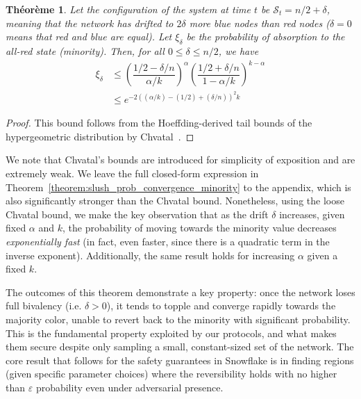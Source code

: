 \documentclass[letterpaper,twocolumn,10pt]{article}
\newtheorem{theorem}{Théorème}
\theoremstyle{definition}
\begin{document}
\begin{theorem}
Let the configuration of the system at time $t$ be $\mathcal{S}_t = n/2 + \delta$, meaning that the network has drifted to $2\delta$ more blue nodes than red nodes ($\delta = 0$ means that red and blue are equal). Let $\xi_\delta$ be the probability of absorption to the all-red state (minority). Then, for all $0 \leq \delta \leq n/2$, we have 
\begin{equation}
\begin{split}
    \xi_\delta &\leq \left(\dfrac{1/2 - \delta/n}{\alpha/k}\right)^{\alpha}\left(\dfrac{1/2 + \delta/n}{1- \alpha/k}\right)^{k-\alpha}\\
    &\leq e^{-2((\alpha/k) - (1/2) + (\delta/n))^2 k}
\end{split}
\end{equation}
\end{theorem}

\begin{proof}
This bound follows from the Hoeffding-derived tail bounds of the hypergeometric distribution by Chvatal~\cite{chvatal1979tail}. 
\end{proof}

We note that Chvatal's bounds are introduced for simplicity of exposition and are extremely weak.  
We leave the full closed-form expression in Theorem~\ref{theorem:slush_prob_convergence_minority} to the appendix, which is also significantly stronger than the Chvatal bound. 
Nonetheless, using the loose Chvatal bound, we make the key observation that as the drift $\delta$ increases, given fixed $\alpha$ and $k$, the probability of moving towards the minority value decreases \emph{exponentially fast} (in fact, even faster, since there is a quadratic term in the inverse exponent). Additionally, the same result holds for increasing $\alpha$ given a fixed $k$. 

The outcomes of this theorem demonstrate a key property: once the network loses full bivalency (i.e. $\delta > 0$), it tends to topple and converge rapidly towards the majority color, unable to revert back to the minority with significant probability. This is the fundamental property exploited by our protocols, and what makes them secure despite only sampling a small, constant-sized set of the network. The core result that follows for the safety guarantees in Snowflake is in finding regions (given specific parameter choices) where the reversibility holds with no higher than $\varepsilon$ probability even under adversarial presence. 
\end{document}

